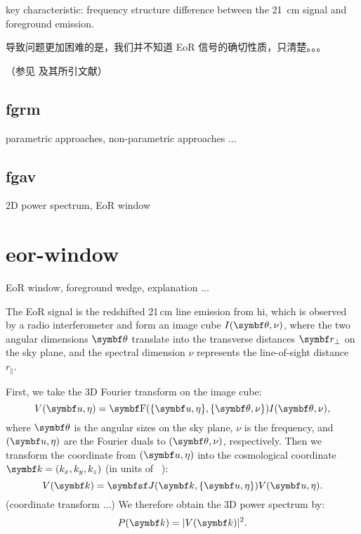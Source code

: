 key characteristic: frequency structure difference between
the 21~cm signal and foreground emission.

导致问题更加困难的是，我们并不知道 EoR 信号的确切性质，只清楚。。。

（参见  及其所引文献）

\subsection{\acl*{fgrm}}  %

parametric approaches, non-parametric approaches ...

\subsection{\acl*{fgav}}  %

2D power spectrum, EoR window


\section{\acl*{eor-window}}  %
\label{sec:eor-window}

EoR window, foreground wedge, explanation ...

The EoR signal is the redshifted 21\,cm line emission from \acs{hi},
which is observed by a radio interferometer and form an image cube
$I(\B{\theta}, \nu)$, where the two angular dimensions $\B{\theta}$
translate into the transverse distances $\B{r}_{\bot}$ on the sky plane,
and the spectral dimension $\nu$ represents the line-of-sight distance
$r_{\parallel}$.

First, we take the 3D Fourier transform on the image cube:
\begin{equation}
  \label{eq:ps-3d-ft}
  V(\B{u}, \eta) = \B{\R{F}}(\{\B{u}, \eta\}, \{\B{\theta}, \nu\})
    I(\B{\theta}, \nu),
\end{equation}
where $\B{\theta}$ is the angular sizes on the sky plane, $\nu$ is the
frequency, and $(\B{u}, \eta)$ are the Fourier duals to
$(\B{\theta}, \nu)$, respectively.
Then we transform the coordinate from $(\B{u}, \eta)$ into the
cosmological coordinate $\B{k} = (k_x, k_y, k_z)$
(in units of \si{\per\cMpc}):
\begin{equation}
  \label{eq:coordinate-transform}
  V(\B{k}) = \M{J}(\B{k}, \{\B{u}, \eta\}) V(\B{u}, \eta).
\end{equation}
(coordinate transform ...)
We therefore obtain the 3D power spectrum by:
\begin{equation}
  \label{eq:3d-ps}
  P(\B{k}) = |V(\B{k})|^2.
\end{equation}

